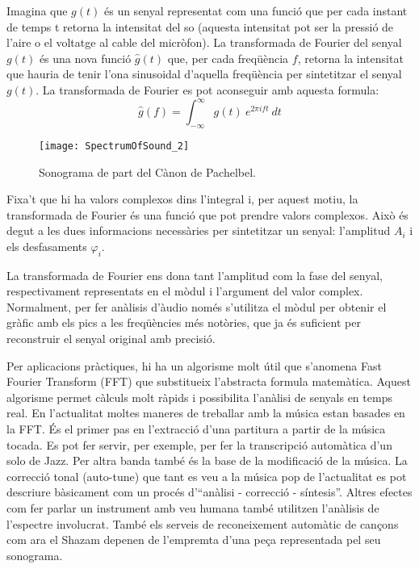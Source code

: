Imagina que $g(t)$ és un senyal representat com una funció que per cada instant de temps t retorna la intensitat del so (aquesta intensitat pot ser la pressió de l'aire o el voltatge al cable del micròfon). La transformada de Fourier del senyal $g(t)$ és una nova funció $\hat g(t)$ que, per cada freqüència $f$, retorna la intensitat que hauria de tenir l'ona sinusoidal d'aquella freqüència per sintetitzar el senyal $g(t)$. La transformada de Fourier es pot aconseguir amb aquesta formula:
$$\hat g(f) = \int_{-\infty}^{\infty} g(t)\ e^{2\pi i f t } \ dt$$

\begin{wrapfigure}[13]{r}{0.45\textwidth}
\centering
\texttt{[image: SpectrumOfSound\_2]}
\caption*{Sonograma de part del Cànon de Pachelbel.}
\end{wrapfigure}

Fixa't que hi ha valors complexos dins l'integral i, per aquest motiu, la transformada de Fourier és una funció que pot prendre valors complexos. Això és degut a les dues informacions necessàries per sintetitzar un senyal: l'amplitud $A_i$ i els desfasaments $\varphi_i$.

La transformada de Fourier ens dona tant l'amplitud com la fase del senyal, respectivament representats en el mòdul i l'argument del valor complex. Normalment, per fer anàlisis d'àudio només s'utilitza el mòdul per obtenir el gràfic amb els pics a les freqüències més notòries, que ja és suficient per reconstruir el senyal original amb precisió.

Per aplicacions pràctiques, hi ha un algorisme molt útil que s'anomena Fast Fourier Transform (FFT) que substitueix l'abstracta formula matemàtica. Aquest algorisme permet càlculs molt ràpids i possibilita l'anàlisi de senyals en temps real. En l'actualitat moltes maneres de treballar amb la música estan basades en la FFT. És el primer pas en l'extracció d'una partitura a partir de la música tocada. Es pot fer servir, per exemple, per fer la transcripció automàtica d'un solo de Jazz. Per altra banda també és la base de la modificació de la música. La correcció tonal (auto-tune) que tant es veu a la música pop de l'actualitat es pot descriure bàsicament com un procés d'``anàlisi - correcció - síntesis''. Altres efectes com fer parlar un instrument amb veu humana també utilitzen l'anàlisis de l'espectre involucrat. També els serveis de reconeixement automàtic de cançons com ara el Shazam depenen de l'empremta d'una peça representada pel seu sonograma.

